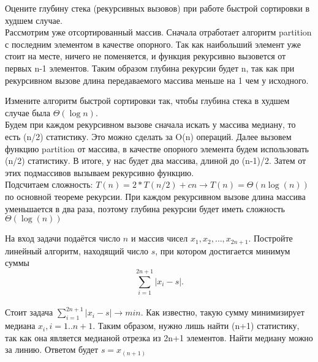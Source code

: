 \documentclass[12pt]{extreport}
\theoremstyle{definiton}
\theoremstyle{definition}
\theoremstyle{definition}
\newcounter{problem}
\newcounter{subproblem}
\def\PRSUBskip{
	\medskip
}
\def\prsub{\PRSUBskip\noindent\stepcounter{subproblem}{\sf \thesubproblem .} }
\begin{document}
	\Pr[3]  \prsub Оцените глубину стека (рекурсивных вызовов) при работе быстрой сортировки в худшем случае.
    \newline
    \\ Рассмотрим уже отсортированный массив. Сначала отработает алгоритм partition с последним элементом в качестве опорного. Так как наибольший элемент уже стоит на месте, ничего не поменяется, и функция рекурсивно вызовется от первых n-1 элементов. Таким образом глубина рекурсии будет n, так как при рекурсивном вызове длина передаваемого массива меньше на 1 чем у исходного.
    \newline
	\prsub Измените алгоритм быстрой сортировки так, чтобы глубина стека в худшем случае была $\Theta(\log n)$.
	\newline
	\\ Будем при каждом рекурсивном вызове сначала искать у массива медиану, то есть (n/2) статистику. Это можно сделать за O(n) операций. Далее вызовем функцию partition от массива, в качестве опорного элемента будем использовать (n/2) статистику. В итоге, у нас будет два массива, длиной до (n-1)/2. Затем от этих подмассивов вызываем рекурсивно функцию.
	\\ Подсчитаем сложность: $T(n) = 2*T(n/2) + cn \to T(n) = \Theta(n\log(n))$ по основной теореме рекурсии. При каждом рекурсивном вызове длина массива уменьшается в два раза, поэтому глубина рекурсии будет иметь сложность $\Theta(\log(n))$
	
	\Pr[3] На вход задачи подаётся число $n$ и массив чисел $x_1, x_2, \ldots, x_{2n+1}$. Постройте линейный алгоритм, находящий число $s$, при котором достигается минимум суммы $$ \sum\limits_{i=1}^{2n+1}|x_i - s|. $$
	\newline
	\\ Стоит задача $\sum\limits_{i=1}^{2n+1}|x_i - s| \to min$. Как известно, такую сумму минимизирует медиана $x_i, i=1..n+1$. Таким образом, нужно лишь найти (n+1) статистику, так как она является медианой отрезка из 2n+1 элементов. Найти медиану можно за линию. Ответом будет $s=x_{(n+1)}$
	
	
\end{document}
